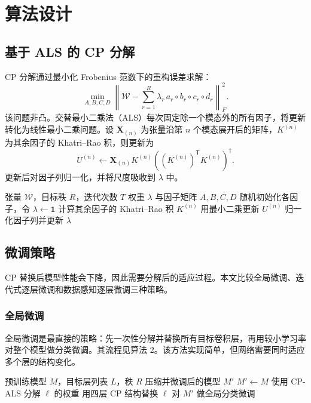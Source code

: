 \documentclass[11pt,a4paper,fontset=fandol]{ctexart}
\begin{document}
\section{算法设计}
\subsection{基于 ALS 的 CP 分解}
CP 分解通过最小化 Frobenius 范数下的重构误差求解：
\begin{equation}
\min_{A,B,C,D}\left\|\mathcal{W}-\sum_{r=1}^{R}\lambda_r\,a_r\circ b_r\circ c_r\circ d_r\right\|_F^2 .
\end{equation}
该问题非凸。交替最小二乘法（ALS）每次固定除一个模态外的所有因子，将更新转化为线性最小二乘问题。设 $\mathbf{X}_{(n)}$ 为张量沿第 $n$ 个模态展开后的矩阵，$K^{(n)}$ 为其余因子的 Khatri--Rao 积，则更新为
\begin{equation}
U^{(n)} \leftarrow \mathbf{X}_{(n)}K^{(n)}\left((K^{(n)})^{\mathsf T}K^{(n)}\right)^\dagger .
\end{equation}
更新后对因子列归一化，并将尺度吸收到 $\lambda$ 中。

\begin{algorithm}[H]
\caption{CP-ALS 分解}
\begin{algorithmic}[1]
\Require 张量 $\mathcal{W}$，目标秩 $R$，迭代次数 $T$
\Ensure 权重 $\lambda$ 与因子矩阵 $A,B,C,D$
\State 随机初始化各因子，令 $\lambda\gets\mathbf{1}$
    \State 计算其余因子的 Khatri--Rao 积 $K^{(n)}$
    \State 用最小二乘更新 $U^{(n)}$
    \State 归一化因子列并更新 $\lambda$
  \EndFor
\EndFor
\end{algorithmic}
\end{algorithm}

\subsection{微调策略}
CP 替换后模型性能会下降，因此需要分解后的适应过程。本文比较全局微调、迭代式逐层微调和数据感知逐层微调三种策略。

\subsubsection{全局微调}
全局微调是最直接的策略：先一次性分解并替换所有目标卷积层，再用较小学习率对整个模型做分类微调。其流程见算法 2。该方法实现简单，但网络需要同时适应多个层的结构变化。

\begin{algorithm}[H]
\caption{全局微调策略}
\begin{algorithmic}[1]
\Require 预训练模型 $M$，目标层列表 $L$，秩 $R$
\Ensure 压缩并微调后的模型 $M'$
\State $M'\gets M$
  \State 使用 CP-ALS 分解 $\ell$ 的权重
  \State 用四层 CP 结构替换 $\ell$
\EndFor
\State 对 $M'$ 做全局分类微调
\end{algorithmic}
\end{algorithm}
\end{document}
